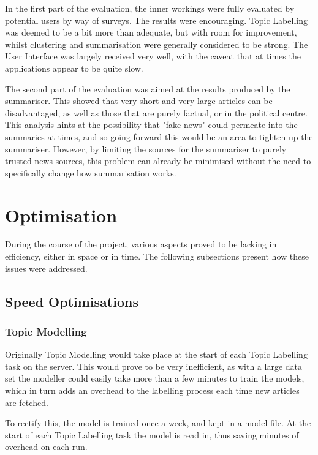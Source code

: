 \documentclass[12pt]{article}
\begin{document}
In the first part of the evaluation, the inner workings were fully evaluated by potential users by way of surveys. The results were encouraging. Topic Labelling was deemed to be a bit more than adequate, but with room for improvement, whilst clustering and summarisation were generally considered to be strong. The User Interface was largely received very well, with the caveat that at times the applications appear to be quite slow. 

The second part of the evaluation was aimed at the results produced by the summariser. This showed that very short and very large articles can be disadvantaged, as well as those that are purely factual, or in the political centre. This analysis hints at the possibility that "fake news" could permeate into the summaries at times, and so going forward this would be an area to tighten up the summariser. However, by limiting the sources for the summariser to purely trusted news sources, this problem can already be minimised without the need to specifically change how summarisation works.


\newpage

\section{Optimisation}

During the course of the project, various aspects proved to be lacking in efficiency, either in space or in time. The following subsections present how these issues were addressed. 

\subsection{Speed Optimisations}

\subsubsection{Topic Modelling}

Originally Topic Modelling would take place at the start of each Topic Labelling task on the server. This would prove to be very inefficient, as with a large data set the modeller could easily take more than a few minutes to train the models, which in turn adds an overhead to the labelling process each time new articles are fetched.

To rectify this, the model is trained once a week, and kept in a model file. At the start of each Topic Labelling task the model is read in, thus saving minutes of overhead on each run.
\end{document}
